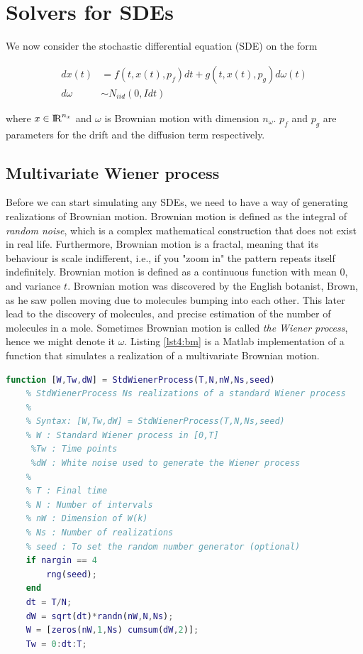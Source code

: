 \chapter{Solvers for SDEs}
We now consider the stochastic differential equation (SDE) on the form

\begin{align}
    dx(t) &= f(t,x(t),p_f)dt + g(t,x(t),p_g)d\omega(t) \\
    d\omega & \sim N_{iid}(0,I dt)
\end{align}

where $x\in \text{I\kern-0.15em R}^{n_x}$ and $\omega$ is Brownian motion with dimension $n_\omega$. $p_f$ and $p_g$ are parameters for the drift and the diffusion term respectively. 

\section{Multivariate Wiener process}
Before we can start simulating any SDEs, we need to have a way of generating realizations of Brownian motion. Brownian motion is defined as the integral of \textit{random noise}, which is a complex mathematical construction that does not exist in real life. Furthermore, Brownian motion is a fractal, meaning that its behaviour is scale indifferent, i.e., if you "zoom in" the pattern repeats itself indefinitely. Brownian motion is defined as a continuous function with mean $0$, and variance $t$. Brownian motion was discovered by the English botanist, Brown, as he saw pollen moving due to molecules bumping into each other. This later lead to the discovery of molecules, and precise estimation of the number of molecules in a mole. Sometimes Brownian motion is called \textit{the Wiener process}, hence we might denote it $\omega$. Listing \ref{lst4:bm} is a Matlab implementation of a function that simulates a realization of a multivariate Brownian motion. 

\begin{lstlisting}[language=Matlab,caption=Simulation of multivariate Brownian motion,label=lst4:bm]
function [W,Tw,dW] = StdWienerProcess(T,N,nW,Ns,seed)
    % StdWienerProcess Ns realizations of a standard Wiener process
    %
    % Syntax: [W,Tw,dW] = StdWienerProcess(T,N,Ns,seed)
    % W : Standard Wiener process in [0,T]
     %Tw : Time points
     %dW : White noise used to generate the Wiener process
    %
    % T : Final time
    % N : Number of intervals
    % nW : Dimension of W(k)
    % Ns : Number of realizations
    % seed : To set the random number generator (optional)
    if nargin == 4
        rng(seed);
    end
    dt = T/N;
    dW = sqrt(dt)*randn(nW,N,Ns);
    W = [zeros(nW,1,Ns) cumsum(dW,2)];
    Tw = 0:dt:T;
\end{lstlisting}

